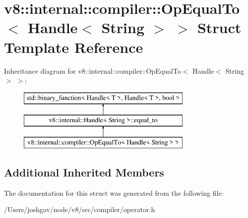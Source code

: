 \hypertarget{structv8_1_1internal_1_1compiler_1_1_op_equal_to_3_01_handle_3_01_string_01_4_01_4}{}\section{v8\+:\+:internal\+:\+:compiler\+:\+:Op\+Equal\+To$<$ Handle$<$ String $>$ $>$ Struct Template Reference}
\label{structv8_1_1internal_1_1compiler_1_1_op_equal_to_3_01_handle_3_01_string_01_4_01_4}
Inheritance diagram for v8\+:\+:internal\+:\+:compiler\+:\+:Op\+Equal\+To$<$ Handle$<$ String $>$ $>$\+:\begin{figure}[H]
\begin{center}
\leavevmode
\includegraphics[height=3.000000cm]{structv8_1_1internal_1_1compiler_1_1_op_equal_to_3_01_handle_3_01_string_01_4_01_4}
\end{center}
\end{figure}
\subsection*{Additional Inherited Members}


The documentation for this struct was generated from the following file\+:\begin{DoxyCompactItemize}
\item 
/\+Users/joshgav/node/v8/src/compiler/operator.\+h\end{DoxyCompactItemize}
